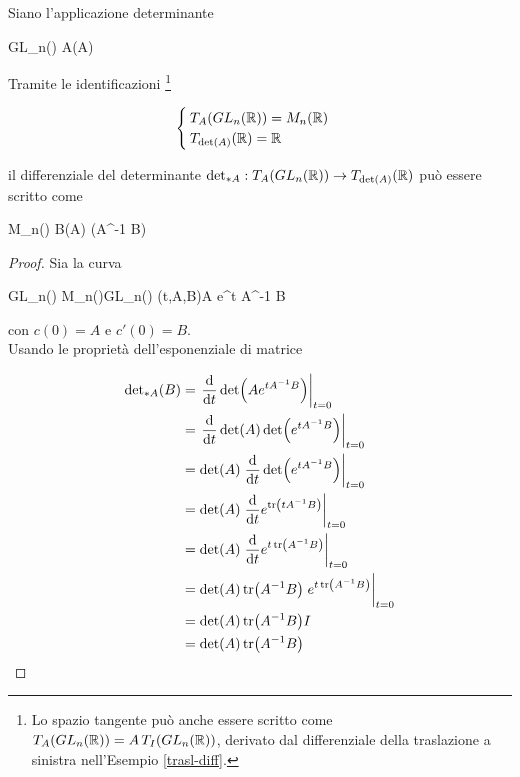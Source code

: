 \begin{corollary}
	Siano l'applicazione determinante
	
	\map{\det}
		{GL_{n}(\R)}{\R}
		{A}{\det(A)}
		
	Tramite le identificazioni \footnote{%
		Lo spazio tangente può anche essere scritto come $ T_{A}(GL_{n}(\mathbb{R})) = A \, T_{I}(GL_{n}(\mathbb{R})) $, derivato dal differenziale della traslazione a sinistra nell'Esempio \ref{trasl-diff}.%
	}
	
	\begin{equation}
		\begin{cases}
			T_{A}(GL_{n}(\mathbb{R})) = M_{n}(\mathbb{R}) \\
			T_{\det(A)}(\mathbb{R}) = \mathbb{R}
		\end{cases}
	\end{equation}

	il differenziale del determinante $ \det_{*A} : T_{A}(GL_{n}(\mathbb{R})) \to T_{\det(A)}(\mathbb{R}) $ può essere scritto come

		{M_{n}(\R)}{\R}
		{B}{\det(A) \tr(A^{-1} B)}
\end{corollary}

\begin{proof}
	Sia la curva
	
	\map{c}
		{\R \times GL_{n}(\R) \times M_{n}(\R)}{GL_{n}(\R)}
		{(t,A,B)}{A e^{t A^{-1} B}}
	
	con $ c(0) = A $ e $ c'(0) = B $.\\
	Usando le proprietà dell'esponenziale di matrice
	
	\begin{align}
		\begin{split}
			{\det}_{*A}(B) &= \eval{ \dv{t} \det(A e^{t A^{-1} B}) }_{t=0} \\
			&= \eval{ \dv{t} \det(A) \det(e^{t A^{-1} B}) }_{t=0} \\
			&= \det(A) \eval{ \dv{t} \det(e^{t A^{-1} B}) }_{t=0} \\
			&= \det(A) \eval{ \dv{t} e^{\tr(t A^{-1} B)} }_{t=0} \\
			&= \det(A) \eval{ \dv{t} e^{t \tr(A^{-1} B)} }_{t=0} \\
			&= \det(A) \tr(A^{-1} B) \eval{ e^{t \tr(A^{-1} B)} }_{t=0} \\
			&= \det(A) \tr(A^{-1} B) I\\
			&= \det(A) \tr(A^{-1} B)
		\end{split}
	\end{align}
\end{proof}

